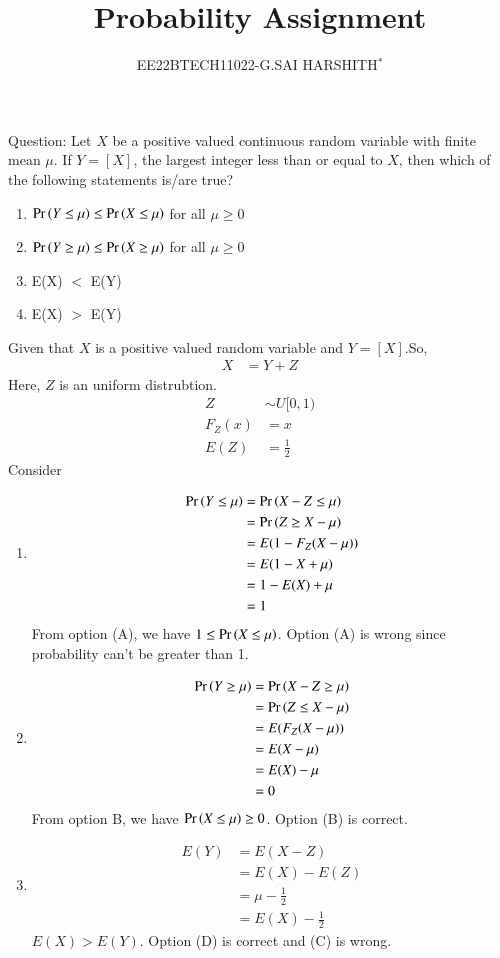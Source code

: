 \documentclass[journal,12pt,twocolumn]{IEEEtran}
\theoremstyle{remark}
\begin{document}

\vspace{3cm}

\title{Probability Assignment}
\author{EE22BTECH11022-G.SAI HARSHITH$^{*}$%
}
\maketitle
\newpage
\bigskip
\renewcommand{\thefigure}{\theenumi}
\renewcommand{\thetable}{\theenumi}

Question: Let $X$ be a positive valued continuous random variable with finite mean $\mu$.
If $Y=[X]$, the largest integer less than or equal to $X$, then which of the
following statements is/are true?
\begin{enumerate}[label=(\Alph*)]
\item $\Pr\left(Y \leq \mu\right) \leq \Pr\left(X \leq \mu\right)$ for all $\mu \geq 0$
\item $\Pr\left(Y \geq \mu\right) \leq \Pr\left(X \geq \mu\right)$ for all $\mu \geq 0$
\item E(X) $<$ E(Y)
\item E(X) $>$ E(Y)
\end{enumerate}
\solution Given that $X$ is a positive valued random variable and $Y=[X]$.So,
\begin{align}
X&=Y+Z
\end{align}
Here, $Z$ is an uniform distrubtion.
\begin{align}
Z &\sim U[0,1)\\
F_Z(x)&=x\\
E(Z)&=\frac{1}{2}
\end{align}
Consider
\begin{enumerate}
\item 
\begin{align}
\Pr\left(Y \leq \mu\right)&=\Pr\left(X-Z \leq \mu\right)\\
&=\Pr\left(Z \geq X-\mu\right)\\
&=E(1-F_Z(X-\mu))\\
&=E(1-X+\mu)\\
&=1-E(X)+\mu\\
&=1
\end{align}
From option (A), we have $1 \leq \Pr\left(X \leq \mu\right)$. Option (A) is wrong since probability can't be greater than 1.
\item
\begin{align}
\Pr\left(Y \geq \mu\right)&=\Pr\left(X-Z \geq \mu\right)\\
&=\Pr\left(Z \leq X-\mu\right)\\
&=E(F_Z(X-\mu))\\
&=E(X-\mu)\\
&=E(X)-\mu\\
&=0
\end{align}
 From option B, we have $\Pr\left(X \leq \mu\right) \geq 0$. Option (B) is correct.
 \item
\begin{align}
E(Y)&=E(X-Z)\\
&=E(X)-E(Z)\\
&=\mu-\frac{1}{2}\\
&=E(X)-\frac{1}{2}
\end{align}
$E(X) > E(Y)$. Option (D) is correct and (C) is wrong.
\end{enumerate}
\end{document}
